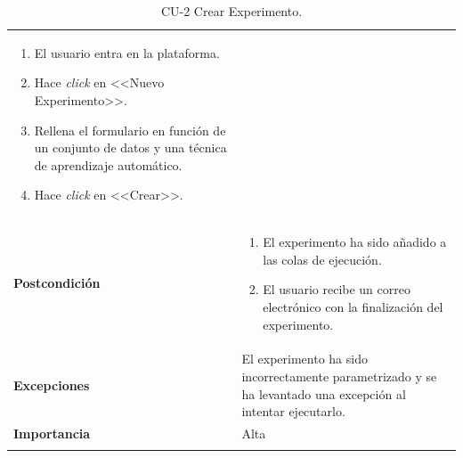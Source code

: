 \begin{longtable}[H]{@{}ll@{}}
\begin{minipage}[t]{0.71\columnwidth}
\begin{enumerate}
\def\labelenumi{\arabic{enumi}.}
\tightlist
\item El usuario entra en la plataforma.
\item Hace \textit{click} en <<Nuevo Experimento>>.
\item Rellena el formulario en función de un conjunto de datos y una técnica de aprendizaje automático.
\item Hace \textit{click} en <<Crear>>.
\end{enumerate}\strut
\end{minipage}\tabularnewline
\begin{minipage}[t]{0.23\columnwidth}\raggedright\strut
\textbf{Postcondición}\strut
\end{minipage} & \begin{minipage}[t]{0.71\columnwidth}\raggedright\strut
\begin{enumerate}
\tightlist
\item El experimento ha sido añadido a las colas de ejecución.
\item El usuario recibe un correo electrónico con la finalización del experimento.
\end{enumerate}\strut
\end{minipage}\tabularnewline
\begin{minipage}[t]{0.23\columnwidth}\raggedright\strut
\textbf{Excepciones}\strut
\end{minipage} & \begin{minipage}[t]{0.71\columnwidth}\raggedright\strut
El experimento ha sido incorrectamente parametrizado y se ha levantado una excepción al intentar ejecutarlo.\strut
\end{minipage}\tabularnewline
\begin{minipage}[t]{0.23\columnwidth}\raggedright\strut
\textbf{Importancia}\strut
\end{minipage} & \begin{minipage}[t]{0.71\columnwidth}\raggedright\strut
Alta\strut
\end{minipage}\tabularnewline
\bottomrule
\caption{CU-2 Crear Experimento.}
\end{longtable}

